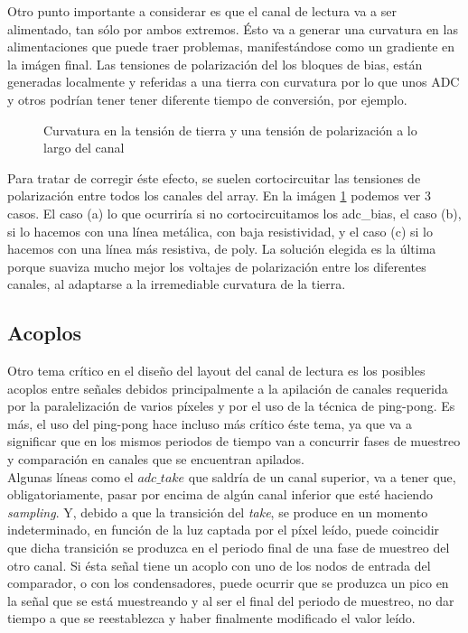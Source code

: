 Otro punto importante a considerar es que el canal de lectura va a ser alimentado,
tan sólo por ambos extremos. Ésto va a generar una curvatura en las alimentaciones
que puede traer problemas, manifestándose como un gradiente en la imágen final.
Las tensiones de polarización del los bloques de bias, están generadas localmente
y referidas a una tierra con curvatura por lo que unos ADC y otros
podrían tener tener diferente tiempo de conversión, por ejemplo.\\

\begin{figure}[ht]
	
	\caption{Curvatura en la tensión de tierra y una tensión de polarización a lo largo del canal}
	\label{fig:adc_poly_short}
\end{figure}

Para tratar de corregir éste efecto, se suelen cortocircuitar las tensiones de polarización
entre todos los canales del array. En la imágen \ref{fig:adc_poly_short} podemos ver
3 casos. El caso (a) lo que ocurriría si no cortocircuitamos los adc\_bias,
el caso (b), si lo hacemos con una línea metálica, con baja resistividad,
y el caso (c) si lo hacemos con una línea más resistiva, de poly.
La solución elegida es la última porque suaviza mucho mejor los voltajes de polarización
entre los diferentes canales, al adaptarse a la irremediable curvatura de la tierra.\\

\subsection{Acoplos}

Otro tema crítico en el diseño del layout del canal de lectura es los posibles acoplos
entre señales debidos principalmente a la apilación de canales requerida por la
paralelización de varios píxeles y por el uso de la técnica de ping-pong. Es más,
el uso del ping-pong hace incluso más crítico éste tema, ya que va a significar
que en los mismos periodos de tiempo van a concurrir fases de muestreo y comparación
en canales que se encuentran apilados.\\

Algunas líneas como el $adc\_take$ que saldría de un canal superior, va a tener que,
obligatoriamente, pasar por encima de algún canal inferior que esté haciendo
\textit{sampling}. Y, debido a que la transición del \textit{take}, se produce
en un momento indeterminado, en función de la luz captada por el píxel leído, puede
coincidir que dicha transición se produzca en el periodo final de una fase de
muestreo del otro canal. Si ésta señal tiene un acoplo con uno de los nodos de
entrada del comparador, o con los condensadores, puede ocurrir que se produzca
un pico en la señal que se está muestreando y al ser el final del periodo de muestreo,
no dar tiempo a que se reestablezca y haber finalmente modificado el valor leído.\\

